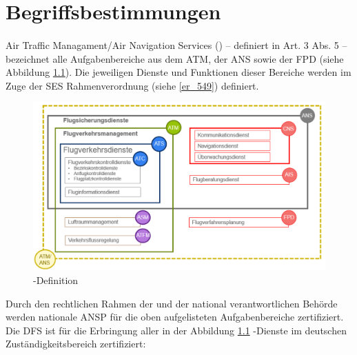 \chapter{Begriffsbestimmungen}
\subsubsection{\atmansf} \label{beg:atmans}
    
    Air Traffic Managament/Air Navigation Services (\atmans) -- definiert in  Art. 3 Abs. 5 -- bezeichnet alle Aufgabenbereiche aus dem \acf{ATM}, der \acf{ANS} sowie der \acf{FPD} (siehe Abbildung \ref{fig:atmans}).
    Die jeweiligen Dienste und Funktionen dieser Bereiche werden im Zuge der \ac{SES} Rahmenverordnung (siehe \ref{er_549}) definiert.
    
    \begin{figure}[h!]
        \centering
        \includegraphics[width=\linewidth]{gfx/atmans.png}
        \caption{\atmansf-Definition \cite{ba_technik}}
        \label{fig:atmans}
    \end{figure}

    \noindent
    Durch den rechtlichen Rahmen der  und der national verantwortlichen Behörde werden nationale \acf{ANSP} für die oben aufgelisteten Aufgabenbereiche zertifiziert.
    Die \ac{DFS} ist für die Erbringung aller in der Abbildung \ref{fig:atmans} \atmans-Dienste im deutschen Zuständigkeitsbereich zertifiziert: \cite[vgl.][17]{ba_technik}
    
